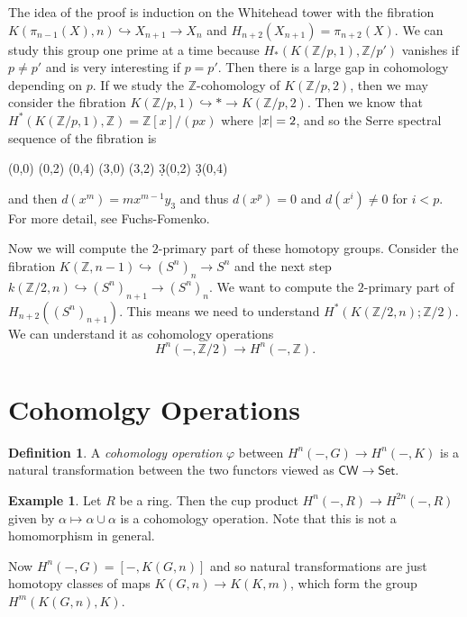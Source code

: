 \documentclass[leqno, openany]{memoir}
\theoremstyle{definition}
\newtheorem{defn}[thm]{Definition}
\newtheorem{exm}[thm]{Example}
\theoremstyle{remark}
\theoremstyle{plain}
\theoremstyle{definition}
\theoremstyle{remark}
\newcommand{\Z}{\mathbb{Z}}
\newcommand{\ms}[1]{\mathsf{#1}}
\begin{document}
The idea of the proof is induction on the Whitehead tower with the fibration
$K(\pi_{n-1}(X), n) \hookrightarrow X_{n+1} \to X_n$ and $H_{n+2}(X_{n+1}) =
\pi_{n+2}(X)$. We can study this group one prime at a time because $H_*(K(\Z/p,
1), \Z/p')$ vanishes if $p \neq p'$ and is very interesting if $p = p'$. Then
there is a large gap in cohomology depending on $p$. If we study the
$\Z$-cohomology of $K(\Z/p, 2)$, then we may consider the fibration $K(\Z/p, 1)
\hookrightarrow * \to K(\Z/p, 2)$. Then we know that $H^*(K(\Z/p, 1), \Z) =
\Z[x]/(px)$ where $\abs{x} = 2$, and so the Serre spectral sequence of the
fibration is \begin{center} \begin{sseqdata}[name=kzp2, classes={draw=none},
cohomological Serre grading] \class["1"](0,0) \class["x"](0,2)
\class["x^2"](0,4) \class["y_3"](3,0) \class["xy_3"](3,2) \d3(0,2) \d3(0,4)
\end{sseqdata} \printpage[name=kzp2, page=3, grid=chess] \end{center} and then
$d(x^m) = mx^{m-1} y_3$ and thus $d(x^p) = 0$ and $d(x^i) \neq 0$ for $i<p$.
For more detail, see Fuchs-Fomenko.

Now we will compute the $2$-primary part of these homotopy groups. Consider the
fibration $K(\Z, n-1) \hookrightarrow {(S^n)}_n \to S^n$ and the next step
$k(\Z/2, n) \hookrightarrow {(S^n)}_{n+1} \to {(S^n)}_n$. We want to compute
the $2$-primary part of $H_{n+2}({(S^n)}_{n+1})$. This means we need to
understand $H^*(K(\Z/2, n); \Z/2)$. We can understand it as cohomology
operations \[ H^n(-, \Z/2) \to H^n(-, \Z). \]

\section{Cohomolgy Operations}%

\begin{defn} A \textit{cohomology operation} $\varphi$ between $H^n(-,G) \to
H^n(-,K)$ is a natural transformation between the two functors viewed as
$\ms{CW} \to \ms{Set}$.  \end{defn}

\begin{exm} Let $R$ be a ring. Then the cup product $H^n(-,R) \to H^{2n}(-,R)$
given by $\alpha \mapsto \alpha \cup \alpha$ is a cohomology operation. Note
that this is not a homomorphism in general.  \end{exm}

Now $H^n(-,G) = [-, K(G, n)]$ and so natural transformations are just homotopy
classes of maps $K(G, n) \to K(K, m)$, which form the group $H^m(K(G, n), K)$.
\end{document}
